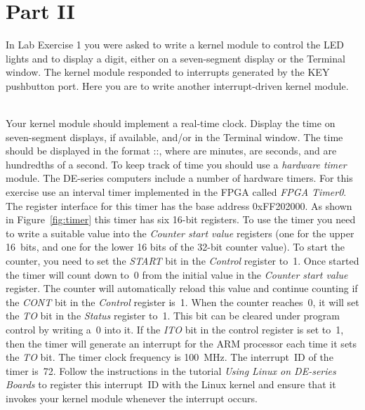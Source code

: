 \documentclass[epsfig,10pt,fullpage]{article}
\begin{document}
\section*{Part II}
\noindent
In Lab Exercise 1 you were asked to write a kernel module to control the LED lights and
to display a digit, either on a seven-segment display or the Terminal window. 
The kernel module responded to interrupts
generated by the KEY pushbutton port. Here you are to write another interrupt-driven
kernel module.

~\\
\noindent
Your kernel module should implement a real-time clock. Display the time on seven-segment
displays, if available, and/or in the Terminal window. The time
should be displayed in the format ::, where  are minutes, 
 are seconds, and  are hundredths of a second. 
To keep track of time you
should use a {\it hardware timer} module. The DE-series computers include a 
number of hardware timers.  For this exercise use an interval timer implemented 
in the FPGA called {\it FPGA Timer0}.
The register interface for this timer has the base address {\sf 0xFF202000}. As shown in 
Figure~\ref{fig:timer} this timer has six 16-bit registers. To use the timer you need
to write a suitable value into the {\it Counter start value} registers (one for the
upper 16~bits, and one for the lower 16 bits of the 32-bit counter value). To start the
counter, you need to set the {\it START} bit in the {\it Control} register to~1. Once
started the timer will count down to~0 from the initial value in the {\it Counter start
value} register.  The counter will automatically reload this value and continue counting 
if the {\it CONT} bit in the {\it Control} register is~1. When the counter reaches~0,
it will set the {\it TO} bit in the {\it Status} register to~1. This bit can be cleared 
under program control by writing a~0 into it. If the {\it ITO} bit in the control register is 
set to~1, then the timer will generate an interrupt for the ARM processor each time 
it sets the {\it TO} bit.
The timer clock frequency is 100~MHz. The interrupt~ID of the timer is~72.
Follow the instructions in the tutorial {\it Using Linux on DE-series Boards} to register this
interrupt~ID with the Linux kernel and ensure that it invokes your kernel module whenever
the interrupt occurs.
\end{document}
